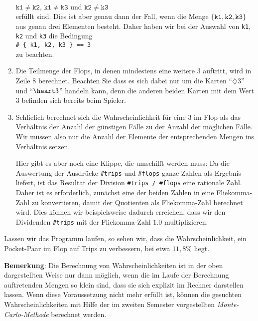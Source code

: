 \begin{enumerate}
      \\[0.2cm]
      \hspace*{1.3cm}
      $\mathtt{k1} \not= \mathtt{k2}$, \quad 
      $\mathtt{k1} \not= \mathtt{k3}$  \quad und \quad
      $\mathtt{k2} \not= \mathtt{k3}$
      \\[0.2cm]
      erf\"{u}llt sind.  Dies ist aber genau dann der Fall, wenn die Menge
      $\{ \mathtt{k1}, \mathtt{k2}, \mathtt{k3} \}$ aus genau drei Elementen besteht.
      Daher haben wir bei der Auswahl von \texttt{k1}, \texttt{k2} und \texttt{k3} die Bedingung
      \\[0.2cm]
      \hspace*{1.3cm}
      \texttt{\# \{ k1, k2, k3 \} == 3 }
      \\[0.2cm]
      zu beachten.
\item Die Teilmenge der Flops, in denen mindestens eine weitere 3 auftritt, wird in Zeile 8
      berechnet.  Beachten Sie dass es sich dabei nur um die Karten ``$\diamondsuit 3$'' und
      ``$\heart 3$'' handeln kann, denn die anderen beiden Karten mit dem Wert $3$ befinden sich bereits
      beim Spieler.
\item Schlie\3lich berechnet sich die Wahrscheinlichkeit f\"{u}r eine 3 im Flop als das Verh\"{a}ltnis der 
      Anzahl der g\"{u}nstigen F\"{a}lle zu der Anzahl der m\"{o}glichen F\"{a}lle.  Wir m\"{u}ssen also nur die Anzahl
      der Elemente der entsprechenden Mengen ins Verh\"{a}ltnis setzen.  

      Hier gibt es aber noch eine Klippe, die umschifft werden muss: Da die Auswertung der Ausdr\"{u}cke
      \texttt{\#trips} und \texttt{\#flops} ganze Zahlen als Ergebnis liefert, ist das Resultat der Division
      \texttt{\#trips / \#flops} eine rationale Zahl.
      Daher ist es erforderlich, zun\"{a}chst eine der beiden Zahlen in eine Flie\3komma-Zahl zu konvertieren,
      damit der Quotienten als Flie\3komma-Zahl berechnet wird.  Dies k\"{o}nnen wir beispielsweise dadurch
      erreichen, dass wir den Dividenden \texttt{\#trips} mit der Flie\3komma-Zahl $1.0$
      multiplizieren.
\end{enumerate}
Lassen wir das Programm laufen, so sehen wir, dass die Wahrscheinlichkeit, ein
Pocket-Paar im Flop auf Trips zu verbessern, bei etwa $11,8\%$ liegt.
\vspace*{0.1cm}

\noindent
\textbf{Bemerkung}:  Die Berechnung von Wahrscheinlichkeiten ist in der oben dargestellten
Weise nur dann m\"{o}glich, wenn die im Laufe der Berechnung auftretenden Mengen so klein
sind, dass sie sich explizit im Rechner darstellen lassen.  Wenn diese Voraussetzung nicht
mehr erf\"{u}llt ist, k\"{o}nnen die gesuchten Wahrscheinlichkeiten mit Hilfe der im zweiten Semester
vorgestellten \emph{Monte-Carlo-Methode} berechnet werden.


